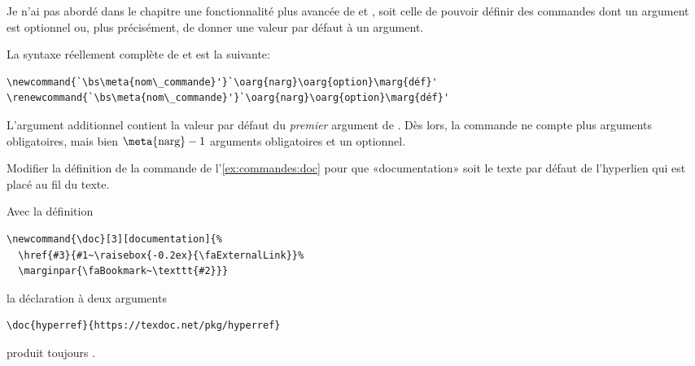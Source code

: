 \begin{exercice}
  Je n'ai pas abordé dans le chapitre une fonctionnalité plus avancée
  de \cmd{\newcommand} et \cmd{\renewcommand}, soit celle de pouvoir
  définir des commandes dont un argument est optionnel ou, plus
  précisément, de donner une valeur par défaut à un argument.

  La syntaxe réellement complète de \cmd{\newcommand} et
  \cmd{\renewcommand} est la suivante:
\begin{lstlisting}
\newcommand{`\bs\meta{nom\_commande}'}`\oarg{narg}\oarg{option}\marg{déf}'
\renewcommand{`\bs\meta{nom\_commande}'}`\oarg{narg}\oarg{option}\marg{déf}'
\end{lstlisting}
  L'argument additionnel  contient la valeur par défaut
  du \emph{premier} argument de \bs{}. Dès lors, la
  commande ne compte plus  arguments obligatoires, mais
  bien $\text{\meta{narg}} - 1$ arguments obligatoires et un optionnel.

  Modifier la définition de la commande \cmdprint{\doc} de
  l'\autoref{ex:commandes:doc} pour que «documentation» soit le texte
  par défaut de l'hyperlien qui est placé au fil du texte.
  \begin{sol}
    Avec la définition
\begin{lstlisting}
\newcommand{\doc}[3][documentation]{%
  \href{#3}{#1~\raisebox{-0.2ex}{\faExternalLink}}%
  \marginpar{\faBookmark~\texttt{#2}}}
\end{lstlisting}
    la déclaration à deux arguments
\begin{lstlisting}
\doc{hyperref}{https://texdoc.net/pkg/hyperref}
\end{lstlisting}
    produit toujours .
  \end{sol}
\end{exercice}

